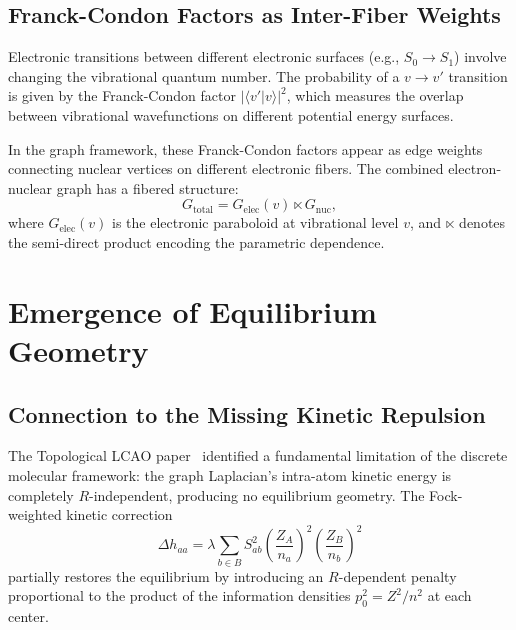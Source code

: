 \documentclass[aps,pra,twocolumn,superscriptaddress,longbibliography]{revtex4-2}
\begin{document}
\subsection{Franck-Condon Factors as Inter-Fiber Weights}

Electronic transitions between different electronic surfaces
(e.g., $S_0 \to S_1$) involve changing the vibrational quantum number.
The probability of a $v \to v'$ transition is given by the
Franck-Condon factor $|\langle v'|v\rangle|^2$, which measures the
overlap between vibrational wavefunctions on different potential energy
surfaces.

In the graph framework, these Franck-Condon factors appear as edge
weights connecting nuclear vertices on different electronic fibers.  The
combined electron-nuclear graph has a fibered structure:
\begin{equation}
G_{\mathrm{total}} = G_{\mathrm{elec}}(v) \ltimes G_{\mathrm{nuc}},
\label{eq:fibered}
\end{equation}
where $G_{\mathrm{elec}}(v)$ is the electronic paraboloid at vibrational
level $v$, and $\ltimes$ denotes the semi-direct product encoding the
parametric dependence.


\section{Emergence of Equilibrium Geometry}
\label{sec:equilibrium}

\subsection{Connection to the Missing Kinetic Repulsion}

The Topological LCAO paper~\cite{lcao_paper} identified a fundamental
limitation of the discrete molecular framework: the graph Laplacian's
intra-atom kinetic energy is completely $R$-independent, producing no
equilibrium geometry.  The Fock-weighted kinetic correction
\begin{equation}
\Delta h_{aa} = \lambda \sum_{b \in B}
S_{ab}^2 \left(\frac{Z_A}{n_a}\right)^2
\left(\frac{Z_B}{n_b}\right)^2
\label{eq:fock_correction}
\end{equation}
partially restores the equilibrium by introducing an $R$-dependent
penalty proportional to the product of the information densities
$p_0^2 = Z^2/n^2$ at each center.
\end{document}
